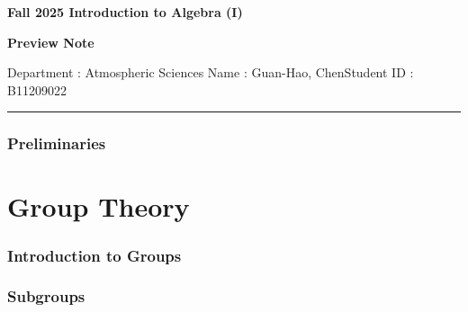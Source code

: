 \documentclass[a4paper,12pt,numbers=noenddot]{article}
\begin{document}
\thispagestyle{firstpagestyle}
\begin{center}
{\bf\large Fall 2025\hspace{4pt} Introduction to Algebra (I)}

\vspace{10pt}
{\bf\large Preview Note}

\vspace{10pt}
{Department : Atmospheric Sciences\hspace{10pt}
Name : Guan-Hao, Chen\hspace{10pt}Student ID : B11209022}
\vspace{6pt}
\textcolor{gray}{\rule{\linewidth}{0.5pt}}
\end{center}
\vspace{-25pt}
\thispagestyle{firstpagestyle}
\begin{center}
    \tableofcontents
\end{center}
\newpage
\thispagestyle{oddpagestyle}
\setcounter{page}{1}
\setcounter{section}{-1}
\section{Preliminaries}

\newpage
\thispagestyle{evenpagestyle}
\part{Group Theory}
\section{Introduction to Groups}

\section{Subgroups}
\end{document}

